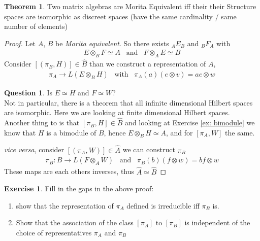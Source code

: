 \documentclass[a4paper]{article}
\theoremstyle{definition}
\theoremstyle{definition}
\newtheorem{question}{Question}
\theoremstyle{definition}
\theoremstyle{theorem}
\newtheorem{theorem}{Theorem}
\theoremstyle{theorem}
\newtheorem{exercise}{Exercise}
\theoremstyle{theorem}
\theoremstyle{definition}
\begin{document}
\begin{theorem}
    Two matrix algebras are Morita Equivalent iff their their Structure spaces
    are isomorphic as discreet spaces (have the same cardinality / same number of elements)
\end{theorem}
\begin{proof}
    Let $A$, $B$ be \textit{Morita equivalent}. So there exists $_A E_B$ and $_B F_A$ with
    \begin{align*}
        E \otimes _B F \simeq A \;\;\; \text{and} \;\;\; F \otimes _A E \simeq B
    \end{align*}
    Consider $[(\pi _B, H)] \in \hat{B}$ than we construct a representation of $A$,
    \begin{align*}
        \pi _A \rightarrow L(E \otimes _B H)\;\;\; \text{with} \;\;\; \pi _A(a) (e \otimes v) = a e \otimes w
    \end{align*}
    \begin{question}
        Is $E \simeq H$ and $F \simeq W$? \\
        Not in particular, there is a theorem that all infinite dimensional Hilbert spaces are isomorphic.
        Here we are looking at finite dimensional Hilbert spaces.\\
        Another thing to is that $[\pi _B, H] \in \hat{B}$ and looking at Exercise \ref{ex: bimodule}
        we know that $H$ is a bimodule of $B$, hence $E \otimes _B H\simeq A$, and for $[\pi _A, W]$
        the same.
    \end{question}
    \textit{vice versa}, consider $[(\pi _A, W)] \in \hat{A}$ we can construct $\pi _B$
    \begin{align*}
        \pi _B: B \rightarrow L(F \otimes _A W) \;\;\; \text{and}\;\;\; \pi _B(b) (f\otimes w) = bf\otimes w
    \end{align*}
    These maps are each others inverses, thus $\hat{A} \simeq \hat{B}$
\end{proof}

\begin{exercise}
    Fill in the gaps in the above proof:
    \begin{enumerate}
        \item show that the representation of $\pi _A$ defined is irreducible iff $\pi _B$ is.
        \item Show that the association of the class $[\pi _A]$ to $[\pi _B]$ is independent
            of the choice of representatives $\pi _A$ and $\pi _B$
    \end{enumerate}
\end{exercise}
\end{document}

